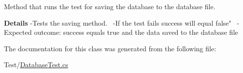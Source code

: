 Method that runs the test for saving the database to the database file. 

{\bfseries Details} -\/\+Tests the saving method.~\newline
 -\/\+If the test fails success will equal false"~\newline
 -\/\+Expected outcome\+: success equals true and the data saved to the database file 

The documentation for this class was generated from the following file\+:\begin{DoxyCompactItemize}
\item 
Test/\hyperlink{_database_test_8cs}{Database\+Test.\+cs}\end{DoxyCompactItemize}
